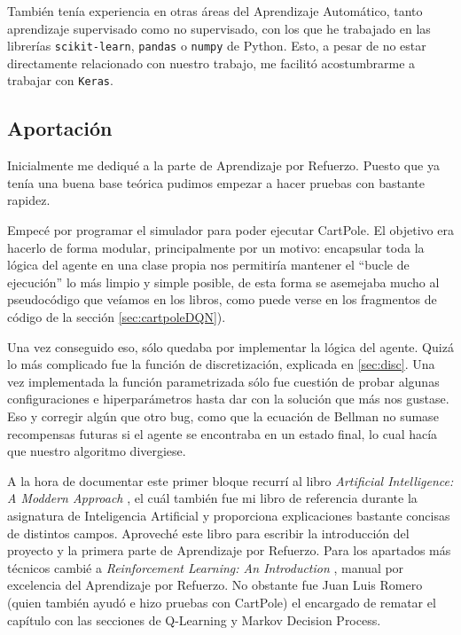 También tenía experiencia en otras áreas del Aprendizaje Automático, tanto aprendizaje supervisado como no supervisado, con los que he trabajado en las librerías \texttt{scikit-learn}, \texttt{pandas} o \texttt{numpy} de Python. Esto, a pesar de no estar directamente relacionado con nuestro trabajo, me facilitó acostumbrarme a trabajar con \texttt{Keras}.


\subsection{Aportación}

Inicialmente me dediqué a la parte de Aprendizaje por Refuerzo. Puesto que ya tenía una buena base teórica pudimos empezar a hacer pruebas con bastante rapidez.

Empecé por programar el simulador para poder ejecutar CartPole. El objetivo era hacerlo de forma modular, principalmente por un motivo: encapsular toda la lógica del agente en una clase propia nos permitiría mantener el ``bucle de ejecución'' lo más limpio y simple posible, de esta forma se asemejaba mucho al pseudocódigo que veíamos en los libros, como puede verse en los fragmentos de código de la sección \ref{sec:cartpoleDQN}).

Una vez conseguido eso, sólo quedaba por implementar la lógica del agente. Quizá lo más complicado fue la función de discretización, explicada en \ref{sec:disc}. Una vez implementada la función parametrizada sólo fue cuestión de probar algunas configuraciones e hiperparámetros hasta dar con la solución que más nos gustase. Eso y corregir algún que otro bug, como que la ecuación de Bellman no sumase recompensas futuras si el agente se encontraba en un estado final, lo cual hacía que nuestro algoritmo divergiese.

A la hora de documentar este primer bloque recurrí al libro \textit{Artificial Intelligence: A Moddern Approach} \citep{Russell:2009:AIM:1671238}, el cuál también fue mi libro de referencia durante la asignatura de Inteligencia Artificial y proporciona explicaciones bastante concisas de distintos campos. Aproveché este libro para escribir la introducción del proyecto y la primera parte de Aprendizaje por Refuerzo. Para los apartados más técnicos cambié a \textit{Reinforcement Learning: An Introduction} \citep{Sutton:2018:RLI:3312046}, manual por excelencia del Aprendizaje por Refuerzo. No obstante fue Juan Luis Romero (quien también ayudó e hizo pruebas con CartPole) el encargado de rematar el capítulo con las secciones de Q-Learning y Markov Decision Process.

